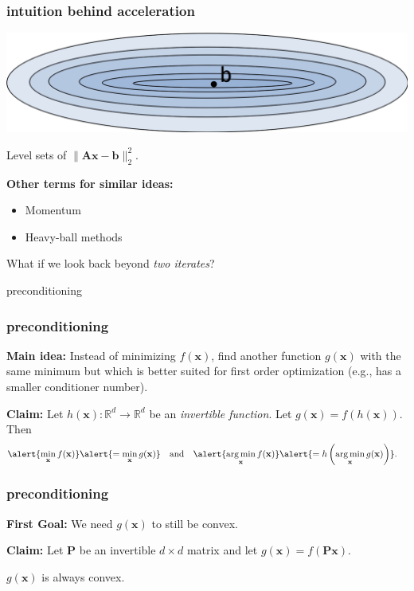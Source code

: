 \documentclass[compress]{beamer}
\newcommand{\bv}[1]{\mathbf{#1}}
\newcommand{\R}{\mathbb{R}}
\DeclareMathOperator*{\argmin}{arg\,min}
\begin{document}
\begin{frame}[t]
	\frametitle{intuition behind acceleration}
	\begin{center}
		\includegraphics[width=\textwidth]{poor_conditioning.png}
		
		Level sets of $\|\bv{A}\bv{x} - \bv{b}\|_2^2$.
	\end{center}

	\textbf{Other terms for similar ideas:}
	\begin{itemize}
		\item Momentum
		\item Heavy-ball methods
	\end{itemize}

	\begin{center}
		\alert{What if we look back beyond \emph{two iterates}?}
	\end{center}
\end{frame}

\begin{frame}[standout]
	\begin{center}
		\large preconditioning
	\end{center}
\end{frame}

\begin{frame}
	\frametitle{preconditioning}
	\textbf{Main idea:}
	Instead of minimizing $f(\bv{x})$, find another function $g(\bv{x})$ with the same minimum but which is better suited for first order optimization (e.g., has a smaller conditioner number).
	
	\vspace{2em}
	\textbf{Claim:} Let $h(\bv{x}): \R^d \rightarrow \R^d$ be an \emph{invertible function}. Let $g(\bv{x}) = f(h(\bv{x}))$. Then
	\begin{align*}
	\alert{\min_{\bv{x}} f(\bv{x})} &\alert{= \min_{\bv{x}} g(\bv{x})} & &\text{and} & \alert{\argmin_{\bv{x}} f(\bv{x})} &\alert{= h\left(\argmin_{\bv{x}} g(\bv{x})\right)}.
	\end{align*}
\end{frame}

\begin{frame}[t]
	\frametitle{preconditioning}
	\textbf{First Goal:} We need $g(\bv{x})$ to still be convex.
	
	\textbf{Claim:} Let $\bv{P}$ be an invertible $d\times d$ matrix and let $g(\bv{x}) = f(\bv{P}\bv{x})$. 
	\begin{center} 
		\alert{$g(\bv{x})$ is always convex.}
	\end{center}
\end{frame}
\end{document}
